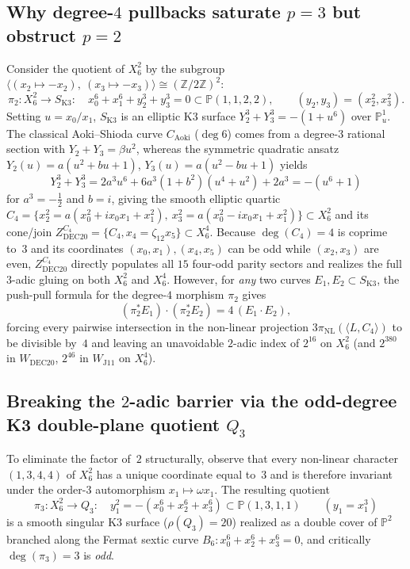 \documentclass[11pt,a4paper]{amsart}
\theoremstyle{definition}
\newcommand{\ZZ}{\mathbb{Z}}
\newcommand{\PP}{\mathbb{P}}
\begin{document}
\subsection{Why degree-\texorpdfstring{$4$}{4} pullbacks saturate \texorpdfstring{$p = 3$}{p = 3} but obstruct \texorpdfstring{$p = 2$}{p = 2}}
Consider the quotient of $X_6^2$ by the subgroup $\langle (x_2 \mapsto -x_2),\ (x_3 \mapsto -x_3) \rangle \cong (\ZZ/2\ZZ)^2$:
\[
  \pi_2 : X_6^2 \longrightarrow S_{\mathrm{K3}} : \quad x_0^6 + x_1^6 + y_2^3 + y_3^3 = 0 \subset \PP(1,1,2,2), \qquad (y_2, y_3) = (x_2^2, x_3^2).
\]
Setting $u = x_0/x_1$, $S_{\mathrm{K3}}$ is an elliptic K3 surface $Y_2^3 + Y_3^3 = -(1 + u^6)$ over $\PP^1_u$.
The classical Aoki--Shioda curve $C_{\mathrm{Aoki}}$ ($\deg 6$) comes from a degree-$3$ rational section with $Y_2 + Y_3 = \beta u^2$, whereas the symmetric quadratic ansatz $Y_2(u) = a(u^2 + b u + 1)$, $Y_3(u) = a(u^2 - b u + 1)$ yields
\[
  Y_2^3 + Y_3^3 = 2 a^3 u^6 + 6 a^3 (1 + b^2)(u^4 + u^2) + 2 a^3 = -(u^6 + 1)
\]
for $a^3 = -\tfrac{1}{2}$ and $b = i$, giving the smooth elliptic quartic $C_4 = \{x_2^2 = a(x_0^2 + i x_0 x_1 + x_1^2),\ x_3^2 = a(x_0^2 - i x_0 x_1 + x_1^2)\} \subset X_6^2$ and its cone/join $Z_{\mathrm{DEC20}}^{C_4} = \{C_4, x_4 = \zeta_{12} x_5\} \subset X_6^4$.
Because $\deg(C_4) = 4$ is coprime to~$3$ and its coordinates $(x_0, x_1), (x_4, x_5)$ can be odd while $(x_2, x_3)$ are even, $Z_{\mathrm{DEC20}}^{C_4}$ directly populates all $15$ four-odd parity sectors and realizes the full $3$-adic gluing on both $X_6^2$ and $X_6^4$.
However, for \emph{any} two curves $E_1, E_2 \subset S_{\mathrm{K3}}$, the push-pull formula for the degree-$4$ morphism $\pi_2$ gives
\[
  (\pi_2^* E_1) \cdot (\pi_2^* E_2) = 4\, (E_1 \cdot E_2),
\]
forcing every pairwise intersection in the non-linear projection $3\pi_{\mathrm{NL}}(\langle L, C_4 \rangle)$ to be divisible by~$4$ and leaving an unavoidable $2$-adic index of $2^{16}$ on $X_6^2$ (and $2^{380}$ in $W_{\mathrm{DEC20}}$, $2^{46}$ in $W_{\mathrm{J11}}$ on $X_6^4$).

\subsection{Breaking the \texorpdfstring{$2$}{2}-adic barrier via the odd-degree K3 double-plane quotient \texorpdfstring{$Q_3$}{Q\_3}}
To eliminate the factor of~$2$ structurally, observe that every non-linear character $(1,3,4,4)$ of $X_6^2$ has a unique coordinate equal to~$3$ and is therefore invariant under the order-$3$ automorphism $x_1 \mapsto \omega x_1$. The resulting quotient
\[
  \pi_3 : X_6^2 \longrightarrow Q_3 : \quad y_1^2 = -(x_0^6 + x_2^6 + x_3^6) \subset \PP(1, 3, 1, 1) \qquad (y_1 = x_1^3)
\]
is a smooth singular K3 surface ($\rho(Q_3) = 20$) realized as a double cover of $\PP^2$ branched along the Fermat sextic curve $B_6 : x_0^6 + x_2^6 + x_3^6 = 0$, and critically $\deg(\pi_3) = 3$ is \emph{odd}.
\end{document}
